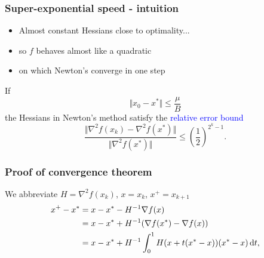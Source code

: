 \documentclass{beamer}
\begin{document}
\begin{frame}
  \frametitle{Super-exponential speed - intuition}

  \begin{itemize}
    \item Almost constant Hessians close to optimality...
    \item so $f$ behaves almost like a quadratic
    \item on which Newton's converge in one step
  \end{itemize}

  \begin{lemma}%
    If
    \begin{equation}
      \Vert x_0 - x^* \Vert \le \frac{\mu}{B}
    \end{equation}
    the Hessians in Newton's method satisfy the \textcolor{blue}{relative error bound}
    \begin{equation}
      \frac{\Vert  \nabla^2 f(x_k) - \nabla^2 f(x^*) \Vert}{\Vert \nabla^2 f(x^*) \Vert} \le {\left( \frac12 \right)}^{2^k-1}.
    \end{equation}
  \end{lemma}
\end{frame}


\begin{frame}
  \frametitle{Proof of convergence theorem}
  We abbreviate $H = \nabla^2 f(x_k)$, $x=x_k$, $x^+ = x_{k+1}$
  \begin{equation}
    \begin{aligned}
      x^+ - x^* &= x - x^* - H^{-1} \nabla f(x) \\
      &= x - x^* + H^{-1}( \nabla f(x^*) - \nabla f(x)) \\
      &= x - x^* + H^{-1} \int_{0}^{1} H(x + t(x^* - x))(x^* - x) \mathop{}\!\mathrm{d} t,
    \end{aligned}
  \end{equation}
\end{frame}
\end{document}
